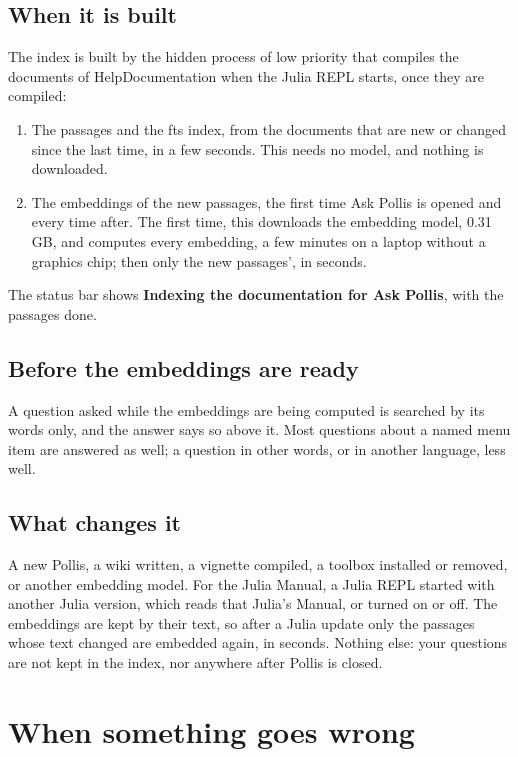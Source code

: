 \subsection{When it is built}
The index is built by the hidden process of low priority that compiles the documents of Help\gt Documentation when the
Julia REPL starts, once they are compiled:
\begin{enumerate}
  \item The passages and the fts index, from the documents that are new or changed since the last time, in a few
    seconds. This needs no model, and nothing is downloaded.
  \item The embeddings of the new passages, the first time Ask Pollis is opened and every time after. The first time,
    this downloads the embedding model, 0.31 GB, and computes every embedding, a few minutes on a laptop without a
    graphics chip; then only the new passages', in seconds.
\end{enumerate}
The status bar shows \textbf{Indexing the documentation for Ask Pollis}, with the passages done.

\subsection{Before the embeddings are ready}
A question asked while the embeddings are being computed is searched by its words only, and the answer says so above
it. Most questions about a named menu item are answered as well; a question in other words, or in another language,
less well.

\subsection{What changes it}
A new Pollis, a wiki written, a vignette compiled, a toolbox installed or removed, or another embedding model. For the
Julia Manual, a Julia REPL started with another Julia version, which reads that Julia's Manual, or
 turned on or off. The embeddings are kept by their text, so after a Julia update only the
passages whose text changed are embedded again, in seconds. Nothing else: your questions are not kept in the index, nor anywhere after Pollis is closed.

\section{When something goes wrong}

